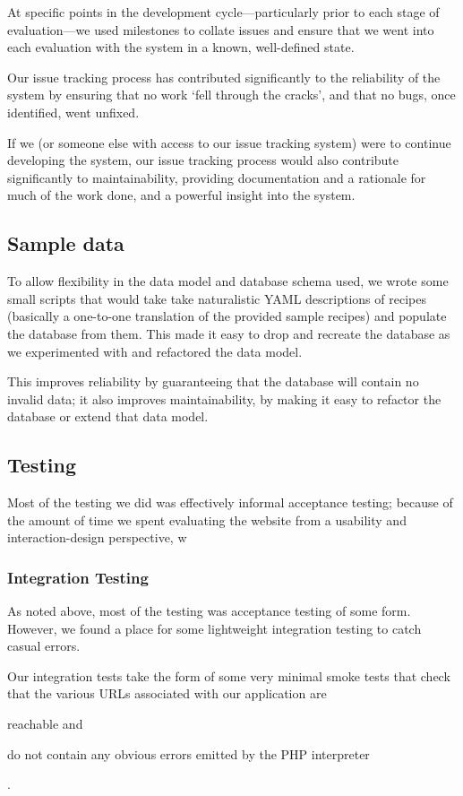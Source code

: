 At specific points in the development cycle---particularly prior to
each stage of evaluation---we used milestones to collate issues and
ensure that we went into each evaluation with the system in a known,
well-defined state.

Our issue tracking process has contributed significantly to the
reliability of the system by ensuring that no work `fell through the
cracks', and that no bugs, once identified, went unfixed.

If we (or someone else with access to our issue tracking system) were
to continue developing the system, our issue tracking process would
also contribute significantly to maintainability, providing
documentation and a rationale for much of the work done, and a
powerful insight into the system.

\subsection{Sample data}

To allow flexibility in the data model and database schema used, we
wrote some small scripts that would take take naturalistic YAML
descriptions of recipes (basically a one-to-one translation of the
provided sample recipes) and populate the database from them. This
made it easy to drop and recreate the database as we experimented with
and refactored the data model.

This improves reliability by guaranteeing that the database will
contain no invalid data; it also improves maintainability, by making
it easy to refactor the database or extend that data model.

\subsection{Testing}

Most of the testing we did was effectively informal acceptance testing; because of
the amount of time we spent evaluating the website from a usability
and interaction-design perspective, w

\subsubsection{Integration Testing}

As noted above, most of the testing was acceptance testing of some
form. However, we found a place for some lightweight integration
testing to catch casual errors.

Our integration tests take the form of some very minimal smoke tests
that check that the various URLs associated with our application are
\begin{inparaenum}
\item reachable and
\item do not contain any obvious errors emitted by the PHP interpreter
\end{inparaenum}.

